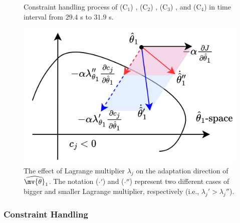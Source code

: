 \documentclass[lettersize,journal]{IEEEtran}
\begin{document}
\begin{figure}[t]
    \centering
    \subfloat[Control input $\tau$ in time interval from $29.4$ s to $31.9$ s (bird's eye view).]{
        \texttt{[image: 
            src/measurement/figures/compare/Fig6.eps
        ]}%
        \label{fig:ctrl:result:scope:control}}
        \vfill
        \vfill
  \caption{
    Constraint handling process of (C$_1$) \protect{}, (C$_2$) \protect{}, (C$_3$) \protect{}, and (C$_4$) \protect{} in time interval from $29.4$ s to $31.9$ s.
  }
\label{fig:ctrl:result:scope}
\end{figure}

\begin{figure}[!t]
	\centering
	\includegraphics[width=0.6\linewidth]{
		src/figures/lambda_effect.drawio.pdf
		}
	\caption{
		The effect of Lagrange multiplier $\lambda_{j}$ on the adaptation direction of $\widehat{ \mv{\theta}}_1$.
		The notation ($\cdot'$) and ($\cdot''$) represent two different cases of bigger and smaller Lagrange multiplier, respectively (i.e., $\lambda_{j}' > \lambda_{j}''$).
	}
	\label{fig:lambda_effect}
\end{figure}

\hfill
\subsubsection{Constraint Handling} \label{sec:sim:constraint}
\end{document}
